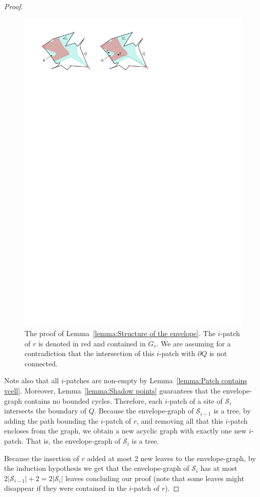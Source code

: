 \documentclass[a4paper,UKenglish]{socg-lipics-v2018}
\newcommand{\icell}[1][i]{${#1}$-patch\xspace}
\newcommand{\icells}[1][i]{${#1}$-patches\xspace}
\newcommand{\s}{\mathcal S}
\begin{document}
{\begin{proof}
\begin{figure}[ht]
\centering
\includegraphics{imgEnvelopeGraph.pdf}
\caption{The proof of Lemma~\ref{lemma:Structure of the envelope}. The \icell of $r$ is denoted in red and contained in $G_r$. We are assuming for a contradiction that the intersection of this \icell with $\partial Q$ is not connected.}
\label{fig:EnvelopeGraph}
\end{figure}

Note also that all \icells are non-empty by Lemma~\ref{lemma:Patch contains vcell}.
Moreover, Lemma~\ref{lemma:Shadow points} guarantees that the envelope-graph contains no bounded cycles. 
Therefore, each \icell of a site of $\s_i$ intersects the boundary of $Q$. 
Because the envelope-graph of $\s_{i-1}$ is a tree, by adding the path bounding the \icell of $r$, and removing all that this \icell encloses from the graph,
we obtain a new acyclic graph with exactly one new \icell. That is, the envelope-graph of $\s_i$ is a tree.

Because the insertion of $r$ added at most 2 new leaves to the envelope-graph, by the induction hypothesis we get that the envelope-graph of $\s_i$ has at most $2|\s_{i-1}| + 2 = 2|\s_i|$ leaves concluding our proof (note that some leaves might disappear if they were contained in the \icell of $r$).
\end{proof}
}
\end{document}
